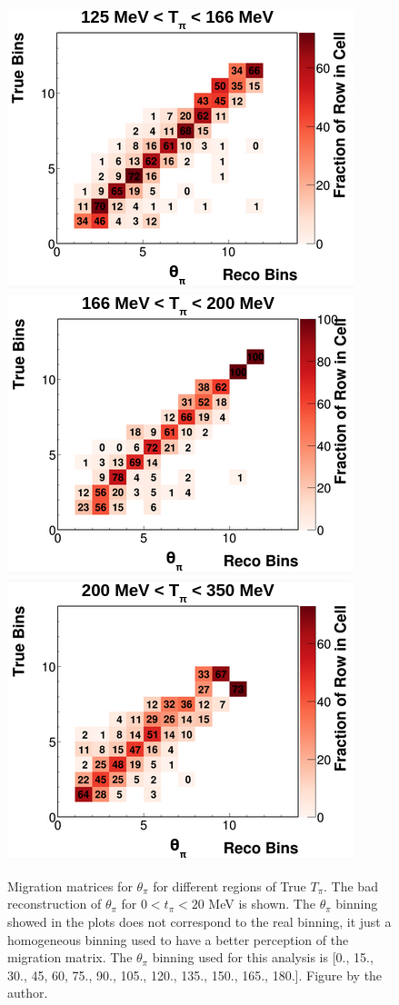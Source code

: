 \begin{figure}[!htb]
    \includegraphics[scale=0.33]{Figures/Chapter4/SignalDefinition/thetapi125to166tpi.png}
    \includegraphics[scale=0.33]{Figures/Chapter4/SignalDefinition/thetapi166to200tpi.png}
    \includegraphics[scale=0.33]{Figures/Chapter4/SignalDefinition/thetapi200to350tpi.png}
    \caption{Migration matrices for $\theta_\pi$ for different regions of True $T_\pi$. The bad reconstruction of $\theta_\pi$ for $0<t_\pi<20$ MeV is shown. The $\theta_\pi$ binning showed in the plots does not correspond to the real binning, it just a homogeneous binning used to have a better perception of the migration matrix. The $\theta_\pi$ binning used for this analysis is [0., 15., 30., 45, 60, 75., 90., 105., 120., 135., 150., 165., 180.]. Figure by the author.}
    \label{fig:Analysis:SignalDefinition:1DAnalysis:thetapivsTpi}
\end{figure}

